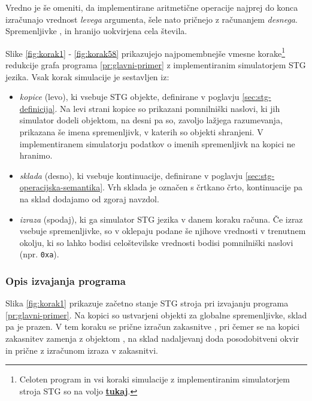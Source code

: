 Vredno je še omeniti, da implementirane aritmetične operacije najprej do konca izračunajo vrednost \emph{levega} argumenta, šele nato pričnejo z ra\-ču\-na\-njem \emph{desnega}. Spremenljivke ,  in  hranijo uokvirjena cela števila.

Slike \ref{fig:korak1} - \ref{fig:korak58} prikazujejo najpomembnejše vmesne korake\footnote{Celoten program in vsi koraki simulacije z implementiranim simulatorjem stroja STG so na voljo \href{https://github.com/nikibizjak/magistrsko-delo/tree/502fb3c305e9b0360b079c28593e1e90e341ecd8/crochet/examples/arithmetic_operations}{\textbf{tukaj}}.} redukcije grafa programa \ref{pr:glavni-primer} z implementiranim simulatorjem STG jezika. Vsak korak simulacije je sestavljen iz:
\begin{itemize}
    \itemsep 0em
    \item \textit{kopice} (levo), ki vsebuje STG objekte, definirane v poglavju \ref{sec:stg-definicija}. Na levi strani kopice so prikazani pomnilniški naslovi, ki jih simulator dodeli objektom, na desni pa so, zavoljo lažjega razumevanja, prikazana še imena spremenljivk, v katerih so objekti shranjeni. V implementiranem simulatorju podatkov o imenih spremenljivk na kopici ne hranimo.
    \item \textit{sklada} (desno), ki vsebuje kontinuacije, definirane v poglavju \ref{sec:stg-operacijska-semantika}. Vrh sklada je označen s črtkano črto, kontinuacije pa na sklad dodajamo od zgoraj navzdol.
    \item \textit{izraza} (spodaj), ki ga simulator STG jezika v danem koraku računa. Če izraz vsebuje spremenljivke, so v oklepaju podane še njihove vrednosti v trenutnem okolju, ki so lahko bodisi celoštevilske vrednosti bodisi pomnilniški naslovi (npr. \texttt{0xa}).
\end{itemize}

\subsubsection{Opis izvajanja programa}

Slika \ref{fig:korak1} prikazuje začetno stanje STG stroja pri izvajanju programa \ref{pr:glavni-primer}. Na kopici so ustvarjeni objekti za globalne spremenljivke, sklad pa je prazen. V tem koraku se prične izračun zakasnitve , pri čemer se na kopici zakasnitev  zamenja z objektom , na sklad nadaljevanj doda posodobitveni okvir in prične z izračunom izraza v zakasnitvi.

